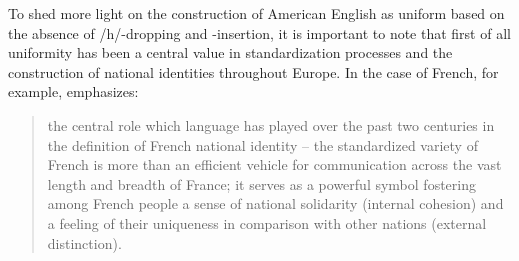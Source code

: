 To shed more light on the construction of American English as uniform based on the absence of /h/-dropping and -insertion, it is important to note that first of all uniformity has been a central value in standardization processes and the construction of national identities throughout Europe. In the case of French, for example, \citet[6]{Lodge2013} emphasizes:

\begin{quote}
the central role which language has played over the past two centuries in the definition of French national identity – the standardized variety of French is more than an efficient vehicle for communication across the vast length and breadth of France; it serves as a powerful symbol fostering among French people a sense of national solidarity (internal cohesion) and a feeling of their uniqueness in comparison with other nations (external distinction).
\end{quote}


